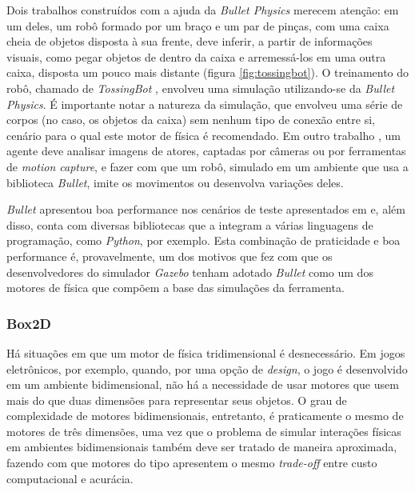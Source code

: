 \documentclass[cic,tc]{iiufrgs}
\begin{document}
Dois trabalhos construídos com a ajuda da \textit{Bullet Physics} merecem
atenção: em um deles, um robô formado por um braço e um par de pinças, com uma
caixa cheia de objetos disposta à sua frente, deve inferir, a partir de
informações visuais, como pegar objetos de dentro da caixa e arremessá-los em
uma outra caixa, disposta um pouco mais distante (figura \ref{fig:tossingbot}).
O treinamento do robô, chamado de \textit{TossingBot} \cite{TossingBot2019}, envolveu uma simulação
utilizando-se da \textit{Bullet Physics}. É importante notar a natureza da
simulação, que envolveu uma série de corpos (no caso, os objetos da caixa) sem
nenhum tipo de conexão entre si, cenário para o qual este motor de física é
recomendado. Em outro trabalho \cite{DeepMimic}, um agente deve analisar imagens de atores,
captadas por câmeras ou por ferramentas de \textit{motion capture}, e fazer com
que um robô, simulado em um ambiente que usa a biblioteca \textit{Bullet},
imite os movimentos ou desenvolva variações deles.

\textit{Bullet} apresentou boa performance nos cenários de teste apresentados
em \cite{LeggedRobotics2018} e, além disso, conta com diversas bibliotecas que a integram a várias
linguagens de programação, como \textit{Python}, por exemplo. Esta combinação de
praticidade e boa performance é, provavelmente, um dos motivos que fez com que
os desenvolvedores do simulador \textit{Gazebo} tenham adotado \textit{Bullet}
como um dos motores de física que compõem a base das simulações da ferramenta.


\subsubsection{Box2D}


Há situações em que um motor de física tridimensional é desnecessário. Em jogos
eletrônicos, por exemplo, quando, por uma opção de \textit{design}, o jogo é
desenvolvido em um ambiente bidimensional, não há a necessidade de usar motores
que usem mais do que duas dimensões para representar seus objetos. O grau de
complexidade de motores bidimensionais, entretanto, é praticamente o mesmo de
motores de três dimensões, uma vez que o problema de simular interações físicas
em ambientes bidimensionais também deve ser tratado de maneira aproximada,
fazendo com que motores do tipo apresentem o mesmo \textit{trade-off} entre
custo computacional e acurácia.
\end{document}
